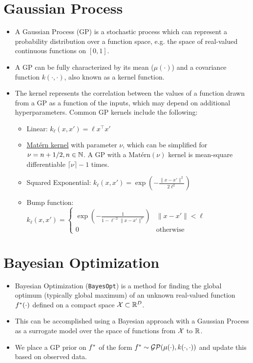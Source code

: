 \documentclass[11pt]{article}
\def\BayesOpt{\texttt{BayesOpt}}
\def\calGP{\mathcal{GP}}
\def\Matern{\textrm{Mat\'{e}rn}}
\begin{document}
\section{Gaussian Process}
\begin{itemize}[label = , itemsep = -3pt, topsep = -10pt, leftmargin = *]
  \item A Gaussian Process (GP) is a stochastic process which can represent a probability distribution over a function space, e.g. the space of real-valued continuous functions on $[0, 1]$.
  \item A GP can be fully characterized by its mean ($\mu(\cdot)$) and a covariance function $k(\cdot, \cdot)$, also known as a kernel function.

  \item The kernel represents the correlation between the values of a function drawn from a GP as a function of the inputs, which may depend on additional hyperparameters. Common GP kernels include the following:
  \begin{itemize}[label = , itemsep = -2pt, topsep = -10pt]
    \item Linear: $k_{\ell}(x, x') = \ell{x^{\top}x'}$
    \item \href{https://en.wikipedia.org/wiki/Mat%C3%A9rn_covariance_function}{\Matern{} kernel} with parameter $\nu$, which can be simplified for $\nu = n + 1/2, n \in \mathbb{N}$. A GP with a $\Matern(\nu)$ kernel is mean-square differentiable $\lceil \nu \rceil - 1$ times. 
    \item Squared Exponential: $k_{\ell}(x, x') = \exp\left(-\frac{\lVert x - x' \rVert^{2}}{2\ell^2}\right)$
    \item Bump function: $k_{\ell}(x, x') = \begin{cases}\exp\left(-\frac{1}{1 - \ell^{-2}\lVert x - x' \rVert^{2}}\right) & \lVert x - x' \rVert < \ell\\ 0 & \textrm{otherwise}\end{cases}$
  \end{itemize}
  
\end{itemize}

\section{Bayesian Optimization}
\begin{itemize}[label = , itemsep = -3pt, topsep = -10pt, leftmargin = *]
  \item Bayesian Optimization (\BayesOpt{}) is a method for finding the global optimum (typically global maximum) of an unknown real-valued function $f^{*}(\cdot)$ defined on a compact space $\mathcal{X} \subset \mathbb{R}^{D}$.
  \item This can be accomplished using a Bayesian approach with a Gaussian Process as a surrogate model over the space of functions from $\mathcal{X}$ to $\mathbb{R}$. 
  \item We place a GP prior on $f^{*}$ of the form $\fstar \sim \calGP(\mu(\cdot), k(\cdot, \cdot))$ and update this based on observed data.
\end{itemize}
\end{document}
